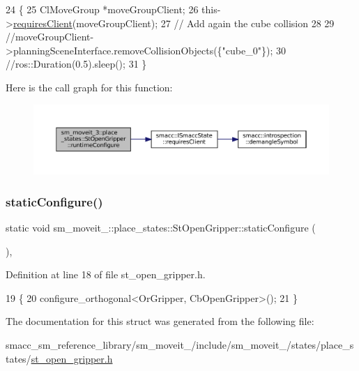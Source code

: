 \begin{DoxyCode}
24     \{
25         ClMoveGroup *moveGroupClient;
26         this->\hyperlink{classsmacc_1_1ISmaccState_a7f95c9f0a6ea2d6f18d1aec0519de4ac}{requiresClient}(moveGroupClient);
27         \textcolor{comment}{// Add again the cube collision}
28 
29         \textcolor{comment}{//moveGroupClient->planningSceneInterface.removeCollisionObjects(\{"cube\_0"\});}
30         \textcolor{comment}{//ros::Duration(0.5).sleep();}
31     \}
\end{DoxyCode}
Here is the call graph for this function\+:
\nopagebreak
\begin{figure}[H]
\begin{center}
\leavevmode
\includegraphics[width=350pt]{structsm__moveit__3_1_1place__states_1_1StOpenGripper_a2390d5b415dd3b7e2c57f68597ea9838_cgraph}
\end{center}
\end{figure}
\mbox{\label{structsm__moveit__3_1_1place__states_1_1StOpenGripper_ae20638f4c9a1b7fce87fc37ce62242fb}} 
\subsubsection{\texorpdfstring{static\+Configure()}{staticConfigure()}}
{\footnotesize\ttfamily static void sm\+\_\+moveit\+\_\+::place\+\_\+states\+::\+St\+Open\+Gripper\+::static\+Configure (\begin{DoxyParamCaption}{ }\end{DoxyParamCaption})\hspace{0.3cm}{\ttfamily [inline]}, {\ttfamily [static]}}



Definition at line 18 of file st\+\_\+open\+\_\+gripper.\+h.


\begin{DoxyCode}
19     \{
20         configure\_orthogonal<OrGripper, CbOpenGripper>();
21     \}
\end{DoxyCode}


The documentation for this struct was generated from the following file\+:\begin{DoxyCompactItemize}
\item 
smacc\+\_\+sm\+\_\+reference\+\_\+library/sm\+\_\+moveit\+\_/include/sm\+\_\+moveit\+\_/states/place\+\_\+states/\hyperlink{3_2include_2sm__moveit__3_2states_2place__states_2st__open__gripper_8h}{st\+\_\+open\+\_\+gripper.\+h}\end{DoxyCompactItemize}
